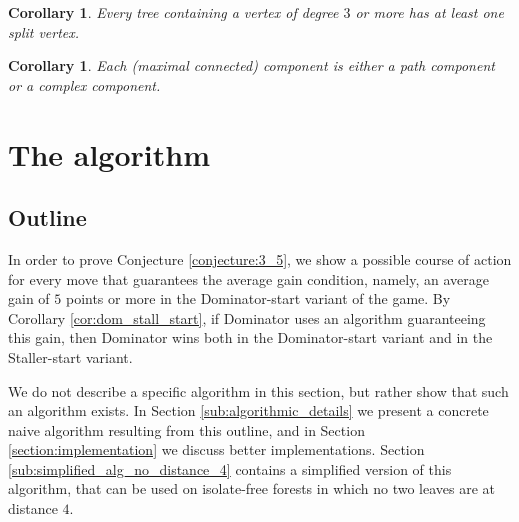 \documentclass[11pt]{article}
\newtheorem{corollary}[theorem]{Corollary}
\theoremstyle{definition}
\begin{document}
\begin{corollary}
Every tree containing a vertex of degree $3$ or more has at least one split vertex.
\end{corollary}

\begin{corollary}
Each (maximal connected) component is either a path component or a complex component.
\end{corollary}


\section{The algorithm}
\label{section:algorithm_outline}

\subsection{Outline}
\label{sub:alg_outline}

In order to prove Conjecture \ref{conjecture:3_5}, we show a possible course of action for every move that guarantees the average gain condition, namely, an average gain of $5$ points or more in the Dominator-start variant of the game.
By Corollary \ref{cor:dom_stall_start}, if Dominator uses an algorithm guaranteeing this gain, then Dominator wins both in the Dominator-start variant and in the Staller-start variant.

We do not describe a specific algorithm in this section, but rather show that such an algorithm exists.
In Section \ref{sub:algorithmic_details} we present a concrete naive algorithm resulting from this outline, and in Section \ref{section:implementation} we discuss better implementations.
Section \ref{sub:simplified_alg_no_distance_4} contains a simplified version of this algorithm, that can be used on isolate-free forests in which no two leaves are at distance $4$.
\end{document}
